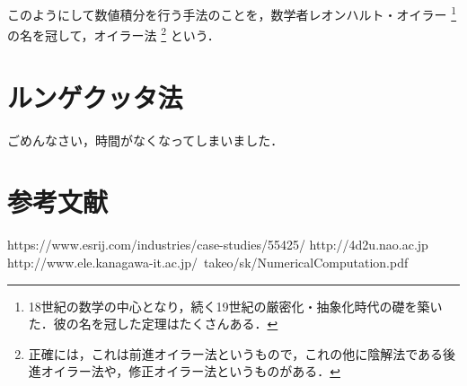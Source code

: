このようにして数値積分を行う手法のことを，数学者レオンハルト・オイラー
\footnote{18世紀の数学の中心となり，続く19世紀の厳密化・抽象化時代の礎を築いた．彼の名を冠した定理はたくさんある．}
の名を冠して，オイラー法
\footnote{正確には，これは前進オイラー法というもので，これの他に陰解法である後進オイラー法や，修正オイラー法というものがある．}
という．

\section{ルンゲクッタ法}
ごめんなさい，時間がなくなってしまいました．

\section{参考文献}
https://www.esrij.com/industries/case-studies/55425/
http://4d2u.nao.ac.jp
http://www.ele.kanagawa-it.ac.jp/~takeo/sk/NumericalComputation.pdf

